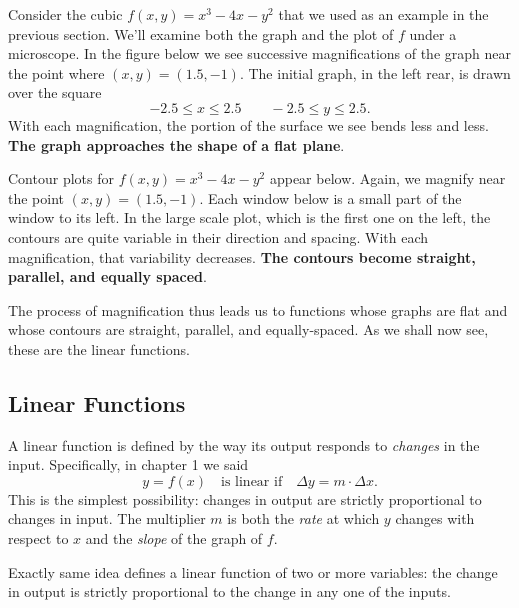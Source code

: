 {{{{	Consider the cubic $f(x, y) = x^3 - 4x - y^2$ that we used as an example in the previous section.  We'll examine both the graph and the plot of $f$ under a microscope.  
In the figure below we see successive magnifications of the graph near the point where $(x, y) = (1.5, -1)$.  The initial graph, in the left rear, is drawn over the square
	\[
-2.5 \leq x \leq 2.5 \qquad -2.5 \leq y \leq 2.5.
\]
With each magnification, the portion of the surface we see bends less and less.  {\bf The graph approaches the shape of a flat plane}.   
	

\newpage
	Contour plots for $f(x, y) = x^3 - 4x - y^2$ appear below.  Again, we magnify near the point $(x, y) = (1.5, -1)$.  Each window below is a small part of the window to its left.  In the large scale plot, which is the first one on the left, the contours are quite variable in their direction and spacing.  With each magnification, that variability decreases.  {\bf The contours become straight, parallel, and equally spaced}.\label{plots1} 

\vspace{158pt}

	The process of magnification thus leads us to functions whose graphs are flat and whose contours are straight, parallel, and equally-spaced.  As we shall now see, these are the linear functions.

\subsection{Linear Functions}

	A linear function 
is defined by the way its output responds to {\em changes\/} in the input.  Specifically, in chapter 1 we said
	\[
y = f(x) \quad \mbox{is linear if} \quad \Delta y = m \cdot \Delta x.
\]
This is the simplest possibility: changes in output are strictly proportional to changes in input.  The multiplier $m$ is both the {\em rate\/} at which $y$ changes with respect to $x$ and the {\em slope\/} of the graph of $f$.  

	Exactly same idea defines a linear function 
of two or more variables: the change in output is strictly proportional to the change in any one of the inputs.
 
}}}}
